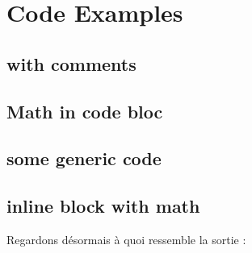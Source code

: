 \chapter{Code Examples}

\section{with comments}

\section{Math in code bloc}

\section{some generic code}

\section{inline block with math}
Regardons désormais à quoi ressemble la sortie :

